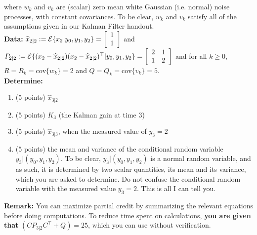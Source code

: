 \documentclass[letterpaper]{article}
\newcommand{\cov}{\mathrm{cov}}
\newcommand{\Expectof}[1]{{\cal E} \{ #1 \}}
\newcommand{\ExpectofGiven}[2]{{\cal E} \{ #1 | #2 \}}
\begin{document}
where $w_k$ and $v_k$ are (scalar) zero mean white Gaussian (i.e. normal) noise processes, with constant covariances. To be clear,  $w_k$ and $v_k$  satisfy all of the assumptions given in our Kalman Filter handout. \\




\noindent \textbf{Data:} $\widehat{x}_{2|2}:=\ExpectofGiven{x_2}{y_0, y_1, y_2}= \left[ \begin{array}{c} 1 \\ 1\end{array} \right]$ and $P_{2|2}:=\ExpectofGiven{(x_{2}-\widehat{x}_{2|2})(x_{2}-\widehat{x}_{2|2})^\top}{y_0, y_1, y_2} =\left[ \begin{array}{rr} 2 & 1\\ 1 & 2\end{array} \right] $ and for all $k\ge 0$, $R=R_k=\cov\{w_k\}=2$ and $Q=Q_k=\cov\{v_k\}=5$.\\

\noindent \textbf{Determine:}

\begin{enumerate}
\setlength{\itemsep}{.15in}
\renewcommand{\labelenumi}{(\alph{enumi})}
\setlength{\itemsep}{.1in}
\item (5 points)  $\widehat{x}_{3|2}$
\item  (5 points) $K_3$ (the Kalman gain at time 3)
\item  (5 points) $\widehat{x}_{3|3}$, when the measured value of $y_3=2$
\item  (5 points) the mean and variance of the conditional random variable $y_{3}{\big|(y_0, y_1, y_2)}$. To be clear, $y_{3}{\big|(y_0, y_1, y_2)}$ is a normal random variable, and as such, it is determined by two scalar quantities, its mean and its variance, which you are asked to determine. Do not confuse the conditional random variable with the measured value $y_3=2$. This is all I can tell you.
\end{enumerate}

\noindent \textbf{Remark:} You can maximize partial credit by summarizing the relevant equations before doing computations. To reduce time spent on calculations, \textbf{you are given that} $\left(C P_{3|2} C^\top + Q\right)=25$, which you can use without verification. \\
\end{document}
